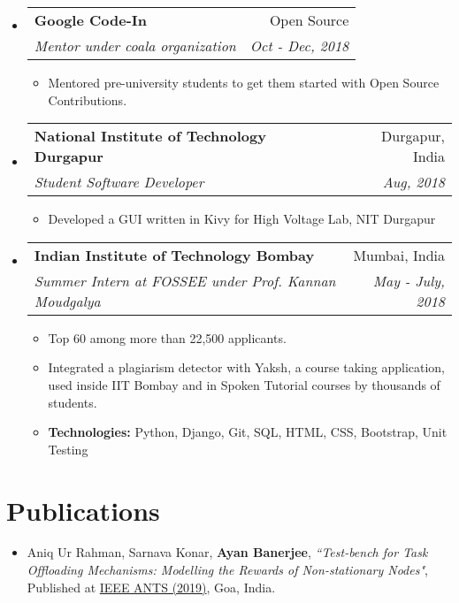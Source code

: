 \documentclass[a4paper,11pt]{article}
\makeatletter
\newcommand{\resumeSubheading}[4]{
  \vspace{-1pt}\item
    \begin{tabular*}{0.97\textwidth}[t]{l@{\extracolsep{\fill}}r}
      \textbf{#1 } & #2 \\
      \textit{\small#3} & \textit{\small #4} \\
    \end{tabular*}\vspace{-5pt}
}
\newcommand{\resumeSubHeadingListStart}{\begin{itemize}[leftmargin=*, topsep=0pt]}
\newcommand{\resumeSubHeadingListEnd}{\end{itemize}}
\newcommand{\resumeItemListStart}{\begin{itemize}}
\newcommand{\resumeItemListEnd}{\end{itemize}\vspace{-5pt}}
\makeatother
\begin{document}
    \resumeSubHeadingListStart
      \resumeSubheading
        {Google Code-In}{Open Source}
        {Mentor under coala organization}{Oct - Dec, 2018}
        \resumeItemListStart
          \item\small
          {Mentored pre-university students to get them started with Open Source Contributions.} %
        \resumeItemListEnd
    \resumeSubHeadingListEnd
    
    \resumeSubHeadingListStart
      \resumeSubheading
      {National Institute of Technology Durgapur}{Durgapur, India}
      {Student Software Developer}{Aug, 2018}
      \resumeItemListStart
        \item\small
        {Developed a GUI written in Kivy for High Voltage Lab, NIT Durgapur}
        \resumeItemListEnd
    \resumeSubHeadingListEnd
    
  \resumeSubHeadingListStart
    \resumeSubheading
    {Indian Institute of Technology Bombay}{Mumbai, India}
    {Summer Intern at FOSSEE under Prof. Kannan Moudgalya}{May - July, 2018}
    \resumeItemListStart
      \item\small
        {Top 60 among more than 22,500 applicants.}
      \item\small
        {Integrated a plagiarism detector with Yaksh, a course taking application, used inside IIT Bombay and in Spoken Tutorial courses by thousands of students.}
      \item\small
      {\textbf{Technologies:} Python, Django, Git, SQL, HTML, CSS, Bootstrap, Unit Testing}
    \resumeItemListEnd
  \resumeSubHeadingListEnd
 

\section{Publications}
    \setlength{\itemsep}{0.5pt}
    \begin{itemize}
        \item{Aniq Ur Rahman, Sarnava Konar, \textbf{Ayan Banerjee}, \textit{``Test-bench for Task Offloading Mechanisms: Modelling the Rewards of Non-stationary Nodes"}, Published at {\href{https://ants2019.ieee-comsoc-ants.org/}{IEEE ANTS (2019)}}, Goa, India.}
    \end{itemize}
\end{document}
